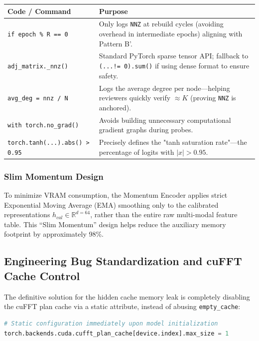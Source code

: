 \documentclass[12pt, a4paper]{article}
\begin{document}
\begin{table}[htbp]
\centering
\renewcommand{\arraystretch}{1.3}
\begin{tabularx}{\textwidth}{|l|X|}
\hline
\textbf{Code / Command} & \textbf{Purpose} \\
\hline
\texttt{if epoch \% R == 0} & Only logs \texttt{NNZ} at rebuild cycles (avoiding overhead in intermediate epochs) aligning with Pattern B'. \\
\hline
\texttt{adj\_matrix.\_nnz()} & Standard PyTorch sparse tensor API; fallback to \texttt{(...!= 0).sum()} if using dense format to ensure safety. \\
\hline
\texttt{avg\_deg = nnz / N} & Logs the average degree per node—helping reviewers quickly verify $\approx K$ (proving \texttt{NNZ} is anchored). \\
\hline
\texttt{with torch.no\_grad()} & Avoids building unnecessary computational gradient graphs during probes. \\
\hline
\texttt{torch.tanh(...).abs() > 0.95} & Precisely defines the "tanh saturation rate"—the percentage of logits with $|x| > 0.95$. \\
\hline
\end{tabularx}
\end{table}

\subsubsection{Slim Momentum Design}
To minimize VRAM consumption, the Momentum Encoder applies strict Exponential Moving Average (EMA) smoothing only to the calibrated representations $h_{cal} \in \mathbb{R}^{d=64}$, rather than the entire raw multi-modal feature table. This ``Slim Momentum'' design helps reduce the auxiliary memory footprint by approximately 98\%.

\subsection{Engineering Bug Standardization and cuFFT Cache Control}
The definitive solution for the hidden cache memory leak is completely disabling the cuFFT plan cache via a static attribute, instead of abusing \texttt{empty\_cache}:
\begin{lstlisting}[language=Python]
# Static configuration immediately upon model initialization
torch.backends.cuda.cufft_plan_cache[device.index].max_size = 1
\end{lstlisting}
\end{document}
